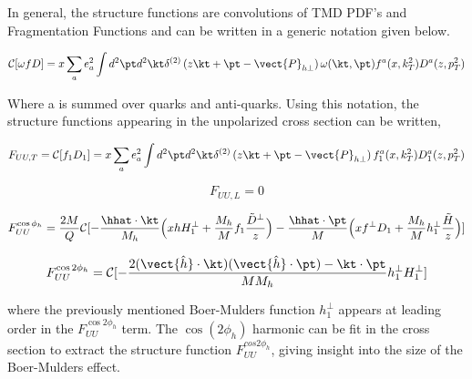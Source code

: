 In general, the structure functions are convolutions of TMD PDF's and Fragmentation Functions and can be written in a generic notation given below.

\begin{equation}
  \mathcal{C}[\omega f D] = x \sum_{a} e^{2}_{a} \int d^{2}\pt d^{2}\kt \delta^{(2)} \left( z\kt + \pt - \vect{P}_{h\perp} \right) \omega (\kt, \pt) f^{a}(x, k_{T}^{2}) D^{a}(z, p_{T}^{2}) 
\end{equation}

Where a is summed over quarks and anti-quarks.  Using this notation, the structure functions appearing in the unpolarized cross section can be written, 

\begin{equation}
F_{UU,T} = \mathcal{C}[f_1 D_1] = x \sum_{a} e^{2}_{a} \int d^{2} \pt d^{2} \kt \delta^{(2)} \left( z\kt + \pt - \vect{P}_{h\perp} \right) f_{1}^{a}(x, k_{T}^{2}) D_{1}^{a}(z, p_{T}^{2})
\end{equation}

\begin{equation}
F_{UU,L} = 0
\end{equation}

\begin{equation}
F_{UU}^{\cos \phi_h} = \frac{2M}{Q} \mathcal{C}[ - \frac{\hhat \cdot \kt}{M_h} \Bigl( x h H_{1}^{\perp} + \frac{M_h}{M} f_1 \frac{\tilde{D}^{\perp}}{z} \Bigr) - \frac{\hhat \cdot \pt}{M} \Bigl( x f^{\perp} D_1 + \frac{M_h}{M} h_1^{\perp} \frac{\tilde{H}}{z} \Bigr)]
\end{equation}

\begin{equation}
F_{UU}^{\cos 2\phi_h} = \mathcal{C}[- \frac{2 (\vect{\hat{h}} \cdot \kt) (\vect{\hat{h}} \cdot \pt) - \kt \cdot \pt}{M M_h} h_{1}^{\perp} H_{1}^{\perp} ]
\end{equation}

where the previously mentioned Boer-Mulders function $h_{1}^{\perp}$ appears at leading order in the $F_{UU}^{\cos 2\phi_h}$ term.  The $\cos( 2\phi_h)$ harmonic can be fit in the cross section to extract the structure function $F_{UU}^{cos 2\phi_h}$, giving insight into the size of the Boer-Mulders effect.



